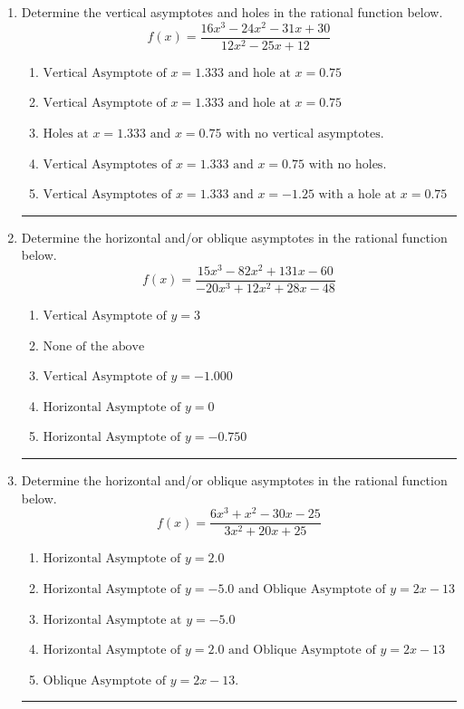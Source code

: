 \documentclass[14pt]{extbook}
\newcommand{\litem}[1]{\item#1\hspace*{-1cm}\rule{\textwidth}{0.4pt}}
\begin{document}
\begin{enumerate}
{\begin{enumerate}[label=\Alph*.]
\end{enumerate} }
\litem{
Determine the vertical asymptotes and holes in the rational function below.\[ f(x) = \frac{16x^{3} -24 x^{2} -31 x + 30}{12x^{2} -25 x + 12} \]\begin{enumerate}[label=\Alph*.]
\item \( \text{Vertical Asymptote of } x = 1.333 \text{ and hole at } x = 0.75 \)
\item \( \text{Vertical Asymptote of } x = 1.333 \text{ and hole at } x = 0.75 \)
\item \( \text{Holes at } x = 1.333 \text{ and } x = 0.75 \text{ with no vertical asymptotes.} \)
\item \( \text{Vertical Asymptotes of } x = 1.333 \text{ and } x = 0.75 \text{ with no holes.} \)
\item \( \text{Vertical Asymptotes of } x = 1.333 \text{ and } x = -1.25 \text{ with a hole at } x = 0.75 \)

\end{enumerate} }
\litem{
Determine the horizontal and/or oblique asymptotes in the rational function below.\[ f(x) = \frac{15x^{3} -82 x^{2} +131 x -60}{-20x^{3} +12 x^{2} +28 x -48} \]\begin{enumerate}[label=\Alph*.]
\item \( \text{Vertical Asymptote of } y = 3  \)
\item \( \text{None of the above} \)
\item \( \text{Vertical Asymptote of } y = -1.000  \)
\item \( \text{Horizontal Asymptote of } y = 0  \)
\item \( \text{Horizontal Asymptote of } y = -0.750  \)

\end{enumerate} }
\litem{
Determine the horizontal and/or oblique asymptotes in the rational function below.\[ f(x) = \frac{6x^{3} + x^{2} -30 x -25}{3x^{2} +20 x + 25} \]\begin{enumerate}[label=\Alph*.]
\item \( \text{Horizontal Asymptote of } y = 2.0  \)
\item \( \text{Horizontal Asymptote of } y = -5.0 \text{ and Oblique Asymptote of } y = 2x -13 \)
\item \( \text{Horizontal Asymptote at } y = -5.0 \)
\item \( \text{Horizontal Asymptote of } y = 2.0 \text{ and Oblique Asymptote of } y = 2x -13 \)
\item \( \text{Oblique Asymptote of } y = 2x -13. \)


\end{enumerate}}
\end{enumerate}
\end{document}
